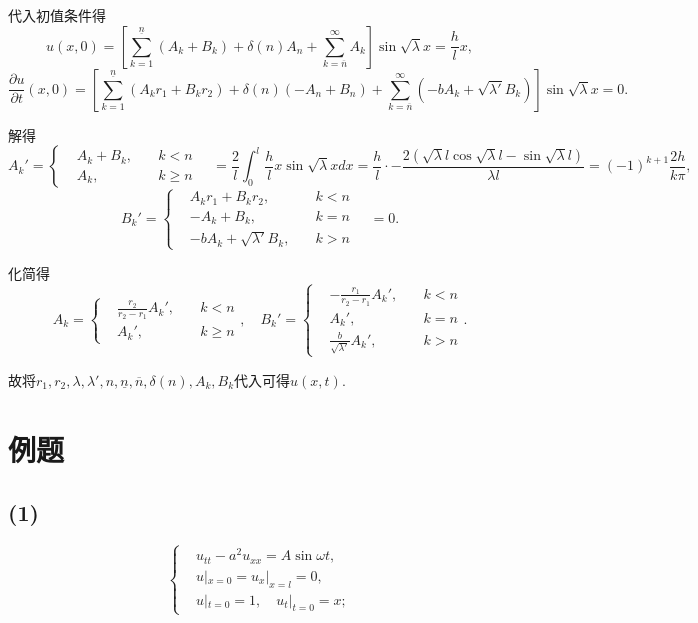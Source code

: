 \documentclass[11pt,a4paper]{article}
\begin{document}
代入初值条件得
$$u(x,0)=\left[\sum_{k=1}^{\underline{n}}(A_k+B_k)+\delta(n)A_n+\sum_{k=\overline{n}}^\infty A_k\right]\sin\sqrt{\lambda}x=\frac{h}{l}x,$$
$$\frac{\partial u}{\partial t}(x,0)=\left[\sum_{k=1}^{\underline{n}}(A_kr_1+B_kr_2)+\delta(n)(-A_n+B_n)+\sum_{k=\overline{n}}^\infty(-bA_k+\sqrt{\lambda'}B_k)\right]\sin\sqrt{\lambda}x=0.$$

解得
$$A_k'=\left\{\begin{aligned}&A_k+B_k,&\quad k<n\\&A_k,&\quad k\geqslant n\end{aligned}\right.
\quad=\frac{2}{l}\int_0^l\frac{h}{l}x\sin\sqrt{\lambda}xdx=\frac{h}{l}\cdot-\frac{2(\sqrt{\lambda}l\cos\sqrt{\lambda}l-\sin\sqrt{\lambda}l)}{\lambda l}=(-1)^{k+1}\frac{2h}{k\pi},$$
$$B_k'=\left\{\begin{aligned}&A_kr_1+B_kr_2,&\quad k<n\\&-A_k+B_k,&\quad k=n\\&-bA_k+\sqrt{\lambda'}B_k,&\quad k>n\end{aligned}\right.\quad=0.$$

化简得
$$A_k=\left\{\begin{aligned}&\frac{r_2}{r_2-r_1}A_k',&\quad k<n\\&A_k',&\quad k\geqslant n\end{aligned}\right.,\quad
B_k'=\left\{\begin{aligned}&-\frac{r_1}{r_2-r_1}A_k',&\quad k<n\\&A_k',&\quad k=n\\&\frac{b}{\sqrt{\lambda'}}A_k',&\quad k>n\end{aligned}\right..$$

故将$r_1,r_2,\lambda,\lambda',n,\underline{n},\overline{n},\delta(n),A_k,B_k$代入可得$u(x,t)$.

\section*{例题}

\subsection*{(1)}

$$
  \left\{\begin{aligned}
     & u_{tt}-a^2u_{xx}=A\sin\omega t,     \\
     & u|_{x=0}=u_x|_{x=l}=0,              \\
     & u|_{t=0}=1,\quad u_t|_{t=0}=x;
  \end{aligned}\right.
$$
\end{document}
